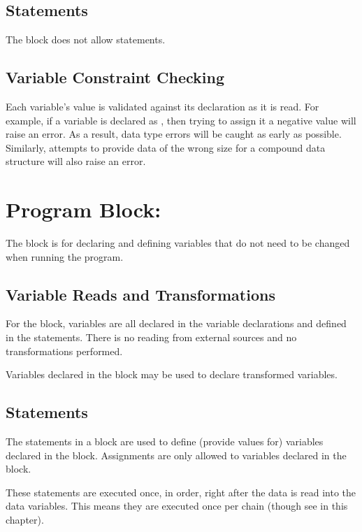 \subsection{Statements}

The  block does not allow statements.

\subsection{Variable Constraint Checking}

Each variable's value is validated against its declaration as it is
read.  For example, if a variable  is declared as
, then trying to assign it a negative value will raise
an error.  As a result, data type errors will be caught as early as
possible.  Similarly, attempts to provide data of the wrong size for a
compound data structure will also raise an error.


\section{Program Block: }

The  block is for declaring and defining
variables that do not need to be changed when running the program.

\subsection{Variable Reads and Transformations}

For the  block, variables are all declared in
the variable declarations and defined in the statements.  There is no
reading from external sources and no transformations performed.

Variables declared in the  block may be used to declare
transformed variables.

\subsection{Statements}

The statements in a  block are used to define
(provide values for) variables declared in the 
block. Assignments are only allowed to variables declared in the
 block.

These statements are executed once, in order, right after the data is
read into the data variables.  This means they are executed once per
chain (though see  in this chapter).

